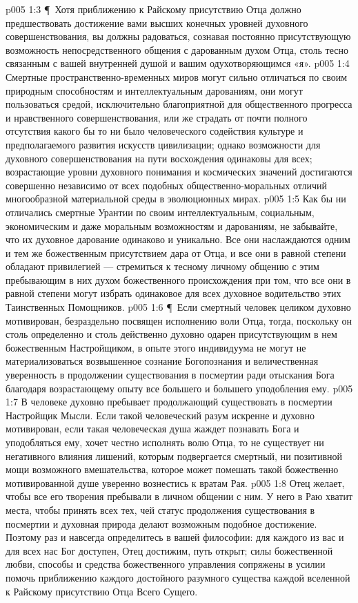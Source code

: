 \vs p005 1:3 \P\ Хотя приближению к Райскому присутствию Отца должно предшествовать достижение вами высших конечных уровней духовного совершенствования, вы должны радоваться, сознавая постоянно присутствующую возможность непосредственного общения с дарованным духом Отца, столь тесно связанным с вашей внутренней душой и вашим одухотворяющимся «я».
\vs p005 1:4 Смертные пространственно\hyp{}временных миров могут сильно отличаться по своим природным способностям и интеллектуальным дарованиям, они могут пользоваться средой, исключительно благоприятной для общественного прогресса и нравственного совершенствования, или же страдать от почти полного отсутствия какого бы то ни было человеческого содействия культуре и предполагаемого развития искусств цивилизации; однако возможности для духовного совершенствования на пути восхождения одинаковы для всех; возрастающие уровни духовного понимания и космических значений достигаются совершенно независимо от всех подобных общественно\hyp{}моральных отличий многообразной материальной среды в эволюционных мирах.
\vs p005 1:5 Как бы ни отличались смертные Урантии по своим интеллектуальным, социальным, экономическим и даже моральным возможностям и дарованиям, не забывайте, что их духовное дарование одинаково и уникально. Все они наслаждаются одним и тем же божественным присутствием дара от Отца, и все они в равной степени обладают привилегией --- стремиться к тесному личному общению с этим пребывающим в них духом божественного происхождения при том, что все они в равной степени могут избрать одинаковое для всех духовное водительство этих Таинственных Помощников.
\vs p005 1:6 \P\ Если смертный человек целиком духовно мотивирован, безраздельно посвящен исполнению воли Отца, тогда, поскольку он столь определенно и столь действенно духовно одарен присутствующим в нем божественным Настройщиком, в опыте этого индивидуума не могут не материализоваться возвышенное сознание Богопознания и величественная уверенность в продолжении существования в посмертии ради отыскания Бога благодаря возрастающему опыту все большего и большего уподобления ему.
\vs p005 1:7 В человеке духовно пребывает продолжающий существовать в посмертии Настройщик Мысли. Если такой человеческий разум искренне и духовно мотивирован, если такая человеческая душа жаждет познавать Бога и уподобляться ему, хочет честно исполнять волю Отца, то не существует ни негативного влияния лишений, которым подвергается смертный, ни позитивной мощи возможного вмешательства, которое может помешать такой божественно мотивированной душе уверенно вознестись к вратам Рая.
\vs p005 1:8 Отец желает, чтобы все его творения пребывали в личном общении с ним. У него в Раю хватит места, чтобы принять всех тех, чей статус продолжения существования в посмертии и духовная природа делают возможным подобное достижение. Поэтому раз и навсегда определитесь в вашей философии: для каждого из вас и для всех нас Бог доступен, Отец достижим, путь открыт; силы божественной любви, способы и средства божественного управления сопряжены в усилии помочь приближению каждого достойного разумного существа каждой вселенной к Райскому присутствию Отца Всего Сущего.
